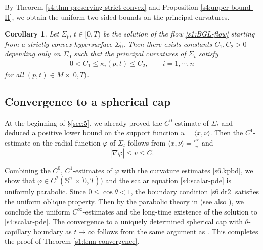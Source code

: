 \documentclass[11pt,reqno]{amsart}
\newtheorem{cor}[thm]{Corollary}
\theoremstyle{definition}
\theoremstyle{remark}
\numberwithin{equation}{section}
\renewcommand{\(}{\left(}
\renewcommand{\)}{\right)}
\renewcommand{\-}{\overline}
\renewcommand{\k}{\kappa}
\renewcommand{\t}{\theta}
\newcommand{\ra}{\rightarrow}
\begin{document}
By Theorem \ref{s4:thm-preserving-strict-convex} and Proposition \ref{s4:upper-bound-H}, we obtain the uniform two-sided bounds on the principal curvatures.
\begin{cor}\label{s4:principal-curv-upper-bound}
	Let $\Sigma_t$, $t\in [0,T)$ be the solution of the flow \eqref{s1:BGL-flow} starting from a strictly convex hypersurface $\Sigma_0$. Then there exists constants $C_1, C_2>0$ depending only on $\Sigma_0$ such that the principal curvatures of $\Sigma_t$ satisfy
	\begin{align}\label{s6.kpbd}
	0<C_1\leq \k_i(p,t)\leq C_2,\qquad i=1,\cdots,n
	\end{align}
for all $(p,t)\in M\times [0,T)$.
\end{cor}


\subsection{Convergence to a spherical cap}


At the beginning of \S \ref{sec:5}, we already proved the $C^0$ estimate of $\Sigma_t$ and deduced a positive lower bound on the support function $u=\langle x,\nu\rangle$. Then the $C^1$-estimate on the radial function $\varphi$ of $\Sigma_t$ follows from $\langle x,\nu\rangle=\frac{e^\varphi}{v}$ and
$$
|\bar{\nabla}\varphi|\leq v\leq C.
$$

Combining the $C^0$, $C^1$-estimates of $\varphi$ with the curvature estimates \eqref{s6.kpbd}, we show that $\varphi\in C^2(\mathbb S_+^n \times [0,T))$ and the scalar equation \eqref{s4:scalar-pde} is uniformly parabolic. Since $0\leq \cos\t<1$, the boundary condition \eqref{s6.dr2} satisfies the uniform oblique property. Then by the parabolic theory in \cite[Theorem 5]{Ural1991} (see also \cite[\S 14]{Lieb96}), we conclude the uniform $C^\infty$-estimates and the long-time existence of the solution to \eqref{s4:scalar-pde}. The convergence to a uniquely determined spherical cap with $\t$-capillary boundary as $t\ra \infty$ follows from the same argument as \cite[Proposition 4.12]{Wang-Weng-Xia2022}. This completes the proof of Theorem \ref{s1:thm-convergence}.
\end{document}
